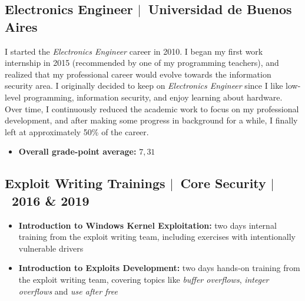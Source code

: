 \documentclass[12pt, a4paper]{article}
\newcommand{\mysep}{{\Large $\mid$}\ }
\newcommand{\titledItem}[2]{\item \textbf{#1:} #2}
\begin{document}
    \subsection*{Electronics Engineer \mysep Universidad de Buenos Aires} \label{subsec:edu1}
    I started the \emph{Electronics Engineer} career in 2010.
    I began my first work internship in 2015 (recommended by one of my programming teachers),
    and realized that my professional career would evolve towards the information security area.
    I originally decided to keep on \emph{Electronics Engineer}
    since I like low-level programming, information security, and enjoy learning about hardware.
    Over time, I continuously reduced the academic work to focus on my professional development,
    and after making some progress in background for a while,
    I finally left at approximately 50\% of the career.
    \begin{itemize}
        \titledItem{Overall grade-point average}{$7,31$}
    \end{itemize}

    \subsection*{Exploit Writing Trainings \mysep Core Security \mysep 2016 \& 2019} \label{subsec:edu2}
    \begin{itemize}
        \titledItem{Introduction to Windows Kernel Exploitation}{%
            two days internal training from the exploit writing team,
            including exercises with intentionally vulnerable drivers
        }
        \titledItem{Introduction to Exploits Development}{%
            two days hands-on training from the exploit writing team,
            covering topics like \emph{buffer overflows}, \emph{integer overflows} and \emph{use after free}
        }
    \end{itemize}
\end{document}
